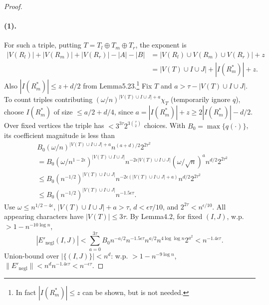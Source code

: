 \documentclass[10pt,a4paper]{article}
\begin{document}
\begin{proof}
\paragraph{(1).} For such a triple, putting $T=T_l\oplus T_m\oplus T_r$, the exponent is
\begin{align*}|V(R_l)|+|V(R_m)|+|V(R_r)|-|A|-|B|&=|V(R_l)\cup V(R_m)\cup V(R_r)|+z\\&=|V(T)\cup I\cup J|+|I(R^*_m)|+z.\end{align*}
Also $|I(R^*_m)|\le z+d/2$ from Lemma5.23.\footnote{In fact $|I(R^*_m)|\le z$ can be shown, but is not needed.} Fix $T$ and $a>\tau-|V(T)\cup I\cup J|$. To count triples contributing $(\omega/n)^{|V(T)\cup I\cup J|+a}\chi_T$ (temporarily ignore $q$), choose $I(R^*_m)$ of size $\le a/2+d/4$, since $a=|I(R^*_m)|+z\ge2|I(R^*_m)|-d/2$. Over fixed vertices the triple has $<3^{3\tau}2^{3\binom\tau2}$ choices. With $B_0=\max\{q(\cdot)\}$, its coefficient magnitude is less than
\begin{align*}&B_0(\omega/n)^{|V(T)\cup I\cup J|+a}n^{(a+d)/2}2^{2\tau^2}\\&=B_0(\omega/n^{1-2\epsilon})^{|V(T)\cup I\cup J|}n^{-2\epsilon|V(T)\cup I\cup J|}(\omega/\sqrt n)^an^{d/2}2^{2\tau^2}\\&\le B_0(n^{-1/2})^{|V(T)\cup I\cup J|}n^{-2\epsilon(|V(T)\cup I\cup J|+a)}n^{d/2}2^{2\tau^2}\\&\le B_0(n^{-1/2})^{|V(T)\cup I\cup J|}n^{-1.5\epsilon\tau}.\end{align*}
Use $\omega\le n^{1/2-4\epsilon}$, $|V(T)\cup I\cup J|+a>\tau$, $d<\epsilon\tau/10$, and $2^{2\tau}<n^{\epsilon/10}$. All appearing characters have $|V(T)|\le3\tau$. By Lemma4.2, for fixed $(I,J)$, w.p. $>1-n^{-10\log n}$,
\[|E'_{\mathrm{negl}}(I,J)|<\sum_{a=0}^{3\tau}B_0n^{-a/2}n^{-1.5\epsilon\tau}n^{a/2}n^{4\log\log n}2^{a^2}<n^{-1.4\epsilon\tau}.\]
Union-bound over $|\{(I,J)\}|<n^d$: w.p. $>1-n^{-9\log n}$, $\|E'_{\mathrm{negl}}\|<n^d n^{-1.4\epsilon\tau}<n^{-\epsilon\tau}$.

\end{proof}
\end{document}

